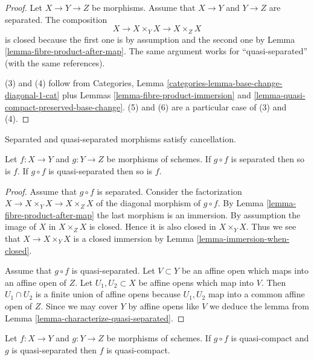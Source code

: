 \begin{proof}
Let $X \to Y \to Z$ be morphisms. Assume that $X \to Y$ and
$Y \to Z$ are separated. The composition
$$
X \to X \times_Y X \to X \times_Z X
$$
is closed because the first one is by assumption and the second
one by Lemma \ref{lemma-fibre-product-after-map}. The same argument
works for ``quasi-separated'' (with the same references).

\medskip\noindent
(3) and (4) follow from Categories,
Lemma \ref{categories-lemma-base-change-diagonal-1-cat} plus
Lemmas \ref{lemma-fibre-product-immersion} and
\ref{lemma-quasi-compact-preserved-base-change}.
(5) and (6) are a particular case of (3) and (4).
\end{proof}

\begin{lemma}
\label{lemma-compose-after-separated}
\begin{slogan}
Separated and quasi-separated morphisms satisfy cancellation.
\end{slogan}
Let $f : X \to Y$ and $g : Y \to Z$ be morphisms of schemes.
If $g \circ f$ is separated then so is $f$.
If $g \circ f$ is quasi-separated then so is $f$.
\end{lemma}

\begin{proof}
Assume that $g \circ f$ is separated.
Consider the factorization $X \to X \times_Y X \to X \times_Z X$
of the diagonal morphism of $g \circ f$.
By Lemma \ref{lemma-fibre-product-after-map}
the last morphism is an immersion. By assumption the image
of $X$ in $X \times_Z X$ is closed. Hence it is also closed
in $X \times_Y X$. Thus we see that $X \to X \times_Y X$
is a closed immersion by Lemma \ref{lemma-immersion-when-closed}.

\medskip\noindent
Assume that $g \circ f$ is quasi-separated.
Let $V \subset Y$ be an affine open which maps into an affine
open of $Z$. Let $U_1, U_2 \subset X$ be affine opens which
map into $V$. Then $U_1 \cap U_2$ is a finite union of affine
opens because $U_1, U_2$ map into a common affine open
of $Z$. Since we may cover $Y$ by affine opens like $V$ we
deduce the lemma from Lemma \ref{lemma-characterize-quasi-separated}.
\end{proof}

\begin{lemma}
\label{lemma-quasi-compact-permanence}
Let $f : X \to Y$ and $g : Y \to Z$ be morphisms of schemes.
If $g \circ f$ is quasi-compact and $g$ is quasi-separated
then $f$ is quasi-compact.
\end{lemma}

